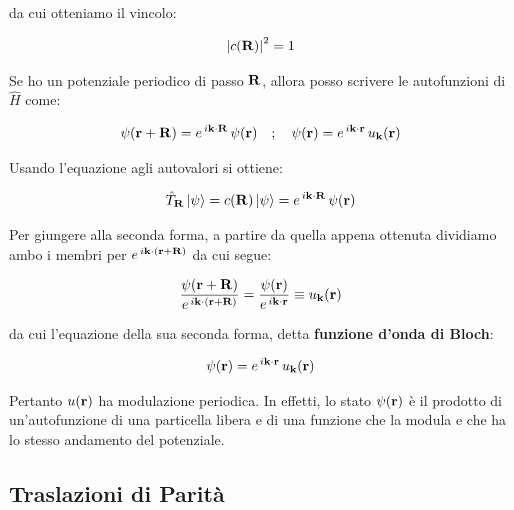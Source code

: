 	da cui otteniamo il vincolo:
	
\begin{align*}
	\qty|c\qty(\vb{R})|^2 = 1
\end{align*}

\begin{myth}
	Se ho un potenziale periodico di passo $\vb{R}$, allora posso scrivere le autofunzioni di $\hat{H}$ come:
	
\begin{align*}
	\psi\qty(\vb{r} + \vb{R}) = e^{ \, i \vb{k} \cdot \vb{R}} \, \psi\qty(\vb{r}) \quad ; \quad \psi\qty(\vb{r}) = e^{ \, i \vb{k} \cdot \vb{r}} \, u_{\vb{k}}\qty(\vb{r})
\end{align*}
\end{myth}

\begin{myprf}
	Usando l'equazione agli autovalori si ottiene:
	
\begin{align*}
	\hat{T}_{\vb{R}} \ket{\psi} = c\qty(\vb{R}) \ket{\psi} = e^{ \, i \vb{k} \cdot \vb{R}} \, \psi\qty(\vb{r})
\end{align*}
	
	Per giungere alla seconda forma,  a partire da quella appena ottenuta dividiamo ambo i membri per $e^{ \, i \vb{k} \cdot \qty(\vb{r} + \vb{R}) }$ da cui segue:
	
\begin{align*}
	\frac{\psi\qty(\vb{r} + \vb{R})}{e^{ \, i \vb{k} \cdot \qty(\vb{r} + \vb{R}) }} = \frac{\psi\qty(\vb{r})}{e^{\, i \vb{k} \cdot \vb{r}}} \equiv u_{\vb{k}}\qty(\vb{r})
\end{align*}

	da cui l'equazione della sua seconda forma, detta \textbf{funzione d'onda di Bloch}:
	
\begin{align*}
	\psi\qty(\vb{r}) = e^{\, i \vb{k} \cdot \vb{r}} \, u_{\vb{k}}\qty(\vb{r})
\end{align*}

	Pertanto $u\qty(\vb{r})$ ha modulazione periodica. In effetti, lo stato $\psi\qty(\vb{r})$ è il prodotto di un'autofunzione di una particella libera e di una funzione che la modula e che ha lo stesso andamento del potenziale.

\end{myprf}

\subsection{Traslazioni di Parità}

